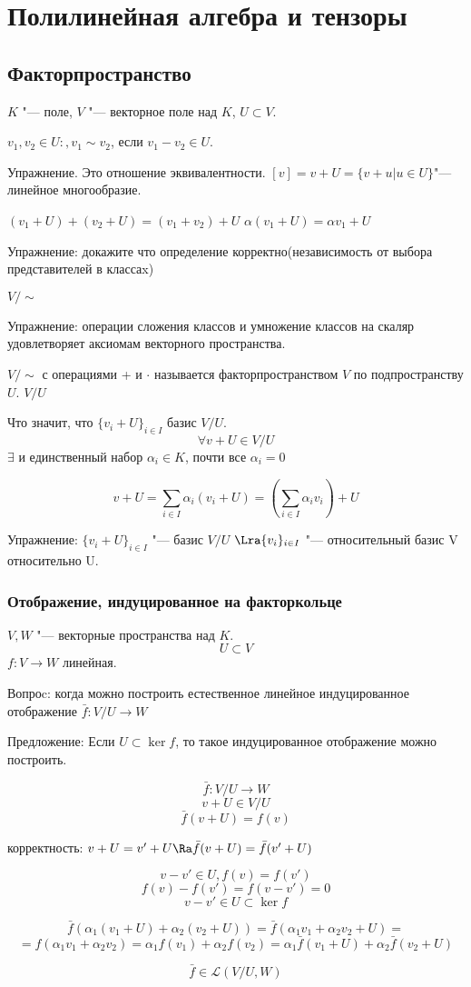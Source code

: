﻿\chapter{Полилинейная алгебра и тензоры}
\section{Факторпространство}
$K$ "--- поле, $V$ "--- векторное поле над $K$, $U \subset V$.

$v_1, v_2 \in U \colon ,v_1 \sim v_2$, если $v_1 - v_2 \in U$. 

Упражнение. Это отношение эквивалентности. 
$[v] = v + U = \{v + u| u \in U\}$"--- линейное многообразие. 

$(v_1 + U) + (v_2 + U) = (v_1 + v_2) + U$
$\alpha(v_1 + U) = \alpha v_1 + U$

Упражнение: докажите что определение корректно(независимость от выбора представителей в классаx)

$V/\sim$

Упражнение: операции сложения классов и умножение классов на скаляр удовлетворяет аксиомам векторного пространства.

$V/\sim$ с операциями + и $\cdot$ называется факторпространством $V$ по подпространству $U$. $V/U$ 

Что значит, что $\{v_i + U\}_{i \in I}$ базис $V/U$.
$$\forall v + U \in V/U$$
$\exists$ и единственный набор $\alpha_i \in K$, почти все $\alpha_i = 0$

$$v + U = \sum_{i \in I}\alpha_i(v_i + U) = (\sum_{i \in I}\alpha_i v_i) + U $$


Упражнение:
$\{v_i + U\}_{i \in I}$  "--- базис $V/U$
$\Lra \{v_i\}_{i \in I}$ "--- относительный базис V относительно U.

\subsection{Отображение, индуцированное на факторкольце}
    $V, W$ "--- векторные пространства над $K$.
    $$U \subset V$$
    $ f \colon V \to W$ линейная. 
    
    Вопроc: когда можно построить естественное линейное индуцированное отображение $\bar f \colon  V / U \to W$

    Предложение: Если $U \subset \ker f$, то такое индуцированное отображение можно построить. 

    $$\bar f \colon V/U \to W$$
    $$v + U \in V/U$$
    $$\bar f(v + U) = f(v)$$

    корректность: $v + U = v' + U \Ra \bar f(v + U) = \bar f (v' + U)$

    $$v - v' \in U, f(v) = f(v')$$
    $$f(v) - f(v') = f(v - v' ) = 0$$
    $$v - v' \in U \subset \ker f $$

    $$\bar f(\alpha_1(v_1 + U) + \alpha_2(v_2 + U)) = \bar f(\alpha_1 v_1 + \alpha_2 v_2 + U) = $$
    $$= f(\alpha_1 v_1 + \alpha_2 v_2) = \alpha_1 f(v_1) + \alpha_2 f(v_2) = \alpha_1 \bar f(v_1 + U) + \alpha_2\bar f(v_2 + U) $$

    $$\bar f \in \mathscr{L}(V/U, W)$$


